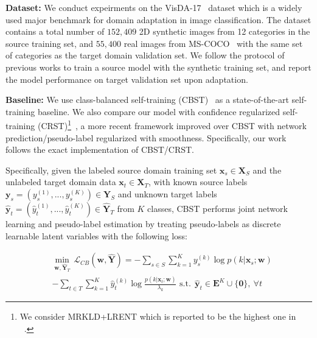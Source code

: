 \textbf{Dataset:} We conduct expeirments on the VisDA-17~\citep{peng2017visda} dataset which is a widely used major benchmark for domain adaptation in image classification. The dataset contains a total number of $152, 409$ 2D synthetic images from 12 categories in the source training set, and $55, 400$ real images from MS-COCO~\cite{lin2014microsoft} with the same set of categories as the target domain validation set. We follow the protocol of previous works to train a source model with the synthetic training set, and report the model performance on target validation set upon adaptation.

\textbf{Baseline:} We use class-balanced self-training (CBST)~\citep{zou2018domain} as a state-of-the-art self-training baseline. We also compare our model with confidence regularized self-training (CRST)\footnote{We consider MRKLD+LRENT which is reported to be the highest one in ~\citep{zou2019confidence}.}~\citep{zou2019confidence}, a more recent framework improved over CBST with network prediction/pseudo-label regularized with smoothness. Specifically, our work follows the exact implementation of CBST/CRST. 

Specifically, given the labeled source domain training set $\mathbf{x}_s \in \mathbf{X}_S$ and the unlabeled target domain data $\mathbf{x}_t \in \mathbf{X}_T$, with known source labels $\mathbf{y}_s=(y_s^{(1)},...,y_s^{(K)}) \in \mathbf{Y}_S$ and unknown target labels $\hat{\mathbf{y}}_t=(\hat{y}_t^{(1)},...,\hat{y}_t^{(K)}) \in \hat{\mathbf{Y}}_T$ from $K$ classes, CBST performs joint network learning and pseudo-label estimation by treating pseudo-labels as discrete learnable latent variables with the following loss:

\begin{small}
\begin{equation}\label{cbst}
\begin{split}
&\underset{\mathbf{w},\hat{\mathbf{Y}}_T}{\mathop{\min }}\,\mathcal{L}_{CB}(\mathbf{w}, \hat{\mathbf{Y}}) = -\sum\limits_{s\in S}{\sum\limits_{k=1}^K{y_s^{(k)}}\log p(k|\mathbf{x}_s;\mathbf{w})}\\[-1mm]
&-\sum\limits_{t\in T}\sum\limits_{k=1}^{K}\hat{y}_{t}^{(k)}\log \frac{p(k|{\mathbf{x}_{t}};\mathbf{w})}{\lambda_k} \text{ s.t.}~~\hat{\mathbf{y}}_t\in \mathbf{E}^K\cup \{\mathbf{0}\},~\forall t
\end{split}
\end{equation}
\end{small}

